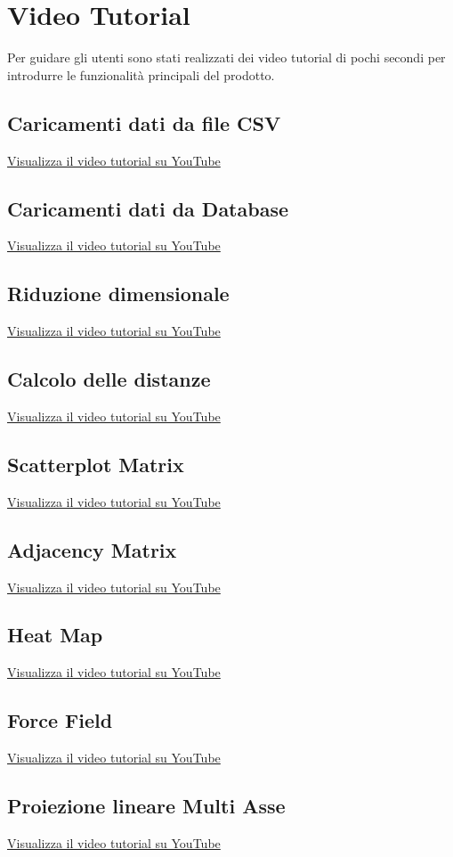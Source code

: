 \section{Video Tutorial}
Per guidare gli utenti sono stati realizzati dei video tutorial di pochi secondi per introdurre le funzionalità principali del prodotto.

\subsection{Caricamenti dati da file CSV}
\textcolor{blue}{\href{https://youtu.be/7NIiFvb8XLY}
{Visualizza il video tutorial su YouTube}}

\subsection{Caricamenti dati da Database}
\textcolor{blue}{\href{https://youtu.be/MJ0WDG5yX-Y}
{Visualizza il video tutorial su YouTube}}

\subsection{Riduzione dimensionale}
\textcolor{blue}{\href{https://youtu.be/HSNzSRYAfGc}
{Visualizza il video tutorial su YouTube}}

\subsection{Calcolo delle distanze}
\textcolor{blue}{\href{https://youtu.be/uEAzlijpLmM}
{Visualizza il video tutorial su YouTube}}

\subsection{Scatterplot Matrix}
\textcolor{blue}{\href{https://youtu.be/1YtSDGRU8N8}
{Visualizza il video tutorial su YouTube}}

\subsection{Adjacency Matrix}
\textcolor{blue}{\href{https://youtu.be/UQl7Rl9yRAQ}
{Visualizza il video tutorial su YouTube}}

\subsection{Heat Map}
\textcolor{blue}{\href{https://youtu.be/GH6PCy3pm_k}
{Visualizza il video tutorial su YouTube}}

\subsection{Force Field}
\textcolor{blue}{\href{https://youtu.be/unLz7DA8gW0}
{Visualizza il video tutorial su YouTube}}

\subsection{Proiezione lineare Multi Asse}
\textcolor{blue}{\href{https://youtu.be/PISKxPttkQ0}
{Visualizza il video tutorial su YouTube}}


